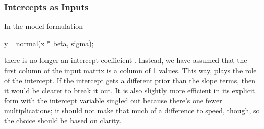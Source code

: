 \subsubsection{Intercepts as Inputs}

In the model formulation
%
\begin{stancode}
  y ~ normal(x * beta, sigma);
\end{stancode}
%
there is no longer an intercept coefficient .  Instead, we
have assumed that the first column of the input matrix  is a
column of 1 values.  This way,  plays the role of the
intercept.  If the intercept gets a different prior than the slope
terms, then it would be clearer to break it out.  It is also slightly
more efficient in its explicit form with the intercept variable
singled out because there's one fewer multiplications; it should not
make that much of a difference to speed, though, so the choice should
be based on clarity.

